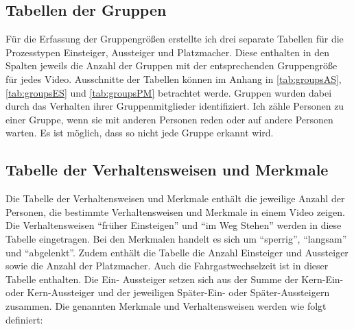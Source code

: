 \subsection{Tabellen der Gruppen}
Für die Erfassung der Gruppengrößen erstellte ich drei separate Tabellen für die Prozesstypen Einsteiger, Aussteiger und Platzmacher. Diese enthalten in den Spalten jeweils die Anzahl der Gruppen mit der entsprechenden Gruppengröße für jedes Video. Ausschnitte der Tabellen können im Anhang in \tablename \ref{tab:groupsAS}, \tablename \ref{tab:groupsES} und \tablename \ref{tab:groupsPM} betrachtet werde. Gruppen wurden dabei durch das Verhalten ihrer Gruppenmitglieder identifiziert. Ich zähle Personen zu einer Gruppe, wenn sie mit anderen Personen reden oder auf andere Personen warten. Es ist möglich, dass so nicht jede Gruppe erkannt wird.

\subsection{Tabelle der Verhaltensweisen und Merkmale}
Die Tabelle der Verhaltensweisen und Merkmale enthält die jeweilige Anzahl der Personen, die bestimmte Verhaltensweisen und Merkmale in einem Video zeigen. Die Verhaltensweisen "`früher Einsteigen"' und "`im Weg Stehen"' werden in diese Tabelle eingetragen. Bei den Merkmalen handelt es sich um "`sperrig"', "`langsam"' und "`abgelenkt"'. Zudem enthält die Tabelle die Anzahl Einsteiger und Aussteiger sowie die Anzahl der Platzmacher. Auch die Fahrgastwechselzeit ist in dieser Tabelle enthalten. Die Ein- \bzw Aussteiger setzen sich aus der Summe der Kern-Ein- oder Kern-Aussteiger und der jeweiligen Später-Ein- oder Später-Aussteigern zusammen. Die genannten Merkmale und Verhaltensweisen werden wie folgt definiert:


